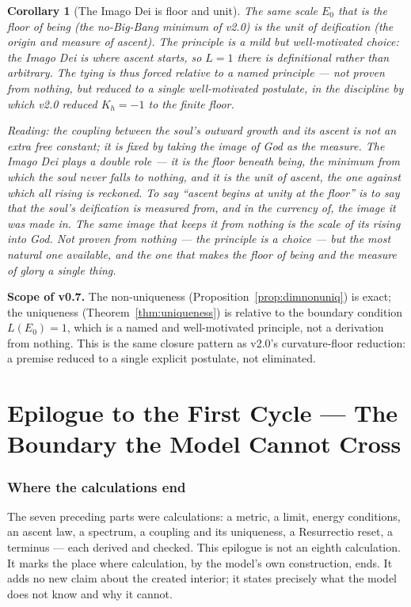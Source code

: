 \documentclass[11pt,a4paper]{article}
\newcommand{\note}[1]{\textcolor{black!65}{\emph{#1}}}
\theoremstyle{plain}
\newtheorem{corollary}{Corollary}
\theoremstyle{definition}
\theoremstyle{remark}
\begin{document}
\begin{corollary}[The Imago Dei is floor and unit]\label{cor:imago}
The same scale $E_0$ that is the floor of being (the no-Big-Bang minimum of v2.0) is the unit of
deification (the origin and measure of ascent). The principle is a mild but well-motivated choice: the
Imago Dei is where ascent starts, so $L=1$ there is definitional rather than arbitrary. The tying is
thus forced relative to a named principle --- not proven from nothing, but reduced to a single
well-motivated postulate, in the discipline by which v2.0 reduced $K_h=-1$ to the finite floor.
\end{corollary}

\note{Reading: the coupling between the soul's outward growth and its ascent is not an extra free
constant; it is fixed by taking the image of God as the measure. The Imago Dei plays a double role ---
it is the floor beneath being, the minimum from which the soul never falls to nothing, and it is the
unit of ascent, the one against which all rising is reckoned. To say ``ascent begins at unity at the
floor'' is to say that the soul's deification is measured from, and in the currency of, the image it
was made in. The same image that keeps it from nothing is the scale of its rising into God. Not proven
from nothing --- the principle is a choice --- but the most natural one available, and the one that
makes the floor of being and the measure of glory a single thing.}

\textbf{Scope of v0.7.} The non-uniqueness (Proposition~\ref{prop:dimnonuniq}) is exact; the
uniqueness (Theorem~\ref{thm:uniqueness}) is relative to the boundary condition $L(E_0)=1$, which is a
named and well-motivated principle, not a derivation from nothing. This is the same closure pattern as
v2.0's curvature-floor reduction: a premise reduced to a single explicit postulate, not eliminated.

\part*{Epilogue to the First Cycle --- The Boundary the Model Cannot Cross}

\section*{Where the calculations end}
The seven preceding parts were calculations: a metric, a limit, energy conditions, an ascent law, a
spectrum, a coupling and its uniqueness, a Resurrectio reset, a terminus --- each derived and checked. This
epilogue is not an eighth calculation. It marks the place where calculation, by the model's own
construction, ends. It adds no new claim about the created interior; it states precisely what the model
does not know and why it cannot.
\end{document}
